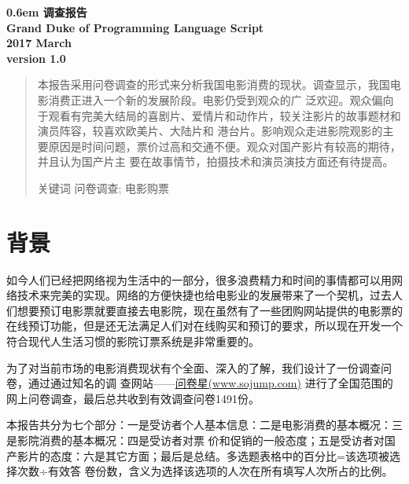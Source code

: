 \documentclass[12pt,twoside]{article}
\newcommand{\heiti}{\CJKfamily{heiti}\enhei}
\newcommand\nbvspace[1][3]{\vspace*{\stretch{#1}}}
\newcommand{\nbtitlestretch}{\spaceskip0.6em}
\begin{document}
\pagestyle{empty}
\begin{center}

\bfseries
\nbvspace[2]
{\heiti
\nbtitlestretch\fontsize{72pt}{20pt} 调查报告\\
}
\nbvspace[1]
\Huge{\akaDora Grand Duke of Programming Language Script}\\
2017 March\\
version 1.0
\nbvspace[1]
\nbvspace[3]
\end{center}
\newpage
\tableofcontents
\newpage
\pagestyle{fancy}


\setcounter{page}{1}
\renewcommand{\abstractname}{\heiti 摘要}
\begin{abstract}
本报告采用问卷调查的形式来分析我国电影消费的现状。调查显示，我国电影消费正进入一个新的发展阶段。电影仍受到观众的广
泛欢迎。观众偏向于观看有完美大结局的喜剧片、爱情片和动作片，较关注影片的故事题材和演员阵容，较喜欢欧美片、大陆片和
港台片。影响观众走进影院观影的主要原因是时间问题，票价过高和交通不便。观众对国产影片有较高的期待，并且认为国产片主
要在故事情节，拍摄技术和演员演技方面还有待提高。
\begin{flushleft}
  \par {\heiti 关键词} 问卷调查; 电影购票
\end{flushleft}

\end{abstract}


\section{背景}
如今人们已经把网络视为生活中的一部分，很多浪费精力和时间的事情都可以用网络技术来完美的实现。网络的方便快捷也给电影业的发展带来了一个契机，过去人们想要预订电影票就要直接去电影院，现在虽然有了一些团购网站提供的电影票的在线预订功能，但是还无法满足人们对在线购买和预订的要求，所以现在开发一个符合现代人生活习惯的影院订票系统是非常重要的。
\par 为了对当前市场的电影消费现状有个全面、深入的了解，我们设计了一份调查问卷，通过通过知名的调
查网站——\href{http://www.sojump.com}{问卷星(www.sojump.com)} 进行了全国范围的网上问卷调查，最后总共收到有效调查问卷1491份。
\par 本报告共分为七个部分：一是受访者个人基本信息：二是电影消费的基本概况：三是影院消费的基本概况：四是受访者对票
价和促销的一般态度；五是受访者对国产影片的态度：六是其它方面；最后是总结。多选题表格中的百分比=该选项被选择次数÷有效答
卷份数，含义为选择该选项的人次在所有填写人次所占的比例。
\end{document}
